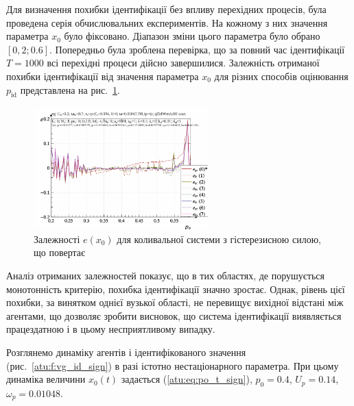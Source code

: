 Для визначення похибки ідентифікації без впливу перехідних
процесів, була проведена серія обчислювальних експериментів.
На кожному з них значення параметра
$ x_0 $ було фіксовано. Діапазон зміни цього параметра було обрано
$ [0,2; 0.6] $. Попередньо була зроблена перевірка, що за повний час
ідентифікації
$ T = 1000 $ всі перехідні процеси дійсно завершилися. Залежність
отриманої похибки ідентифікації від значення параметра
$ x_0 $ для різних способів оцінювання
$ p_\mathrm{id} $ представлена на рис.~\ref{atu:f:vg_id_scan}.

\begin{figure}[ht!]
\begin{center}
  \includegraphics[width=0.60\textwidth]{p/cha/vg/vg_id-p_p_e_ql3rlWvnAAW_scan.png}
\end{center}
\caption{Залежності $ e (x_0) $ для коливальної системи з гістерезисною силою, що повертає }
\label{atu:f:vg_id_scan}
\end{figure}

Аналіз отриманих залежностей показує, що в тих областях, де
порушується монотонність критерію, похибка ідентифікації
значно зростає. Однак, рівень цієї похибки, за винятком однієї
вузької області, не перевищує вихідної відстані між агентами,
що дозволяє зробити висновок, що система ідентифікації
виявляється працездатною і в цьому несприятливому випадку.

Розглянемо динаміку агентів і ідентифікованого значення
(рис.~\ref{atu:f:vg_id_sign}) в разі істотно нестаціонарного параметра. При
цьому динаміка величини
$ x_0 (t) $ задається (\ref{atu:eq:po_t_sign}),
$ p_0 = 0.4 $,
$ U_p = 0.14 $,
$ \omega_p = 0.01048 $.

